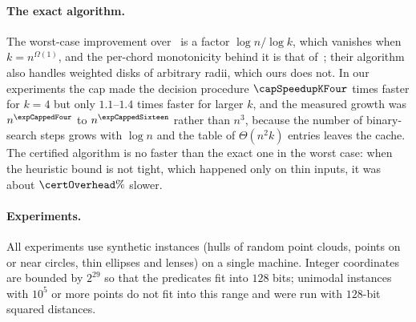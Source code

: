\paragraph{The exact algorithm.}
The worst-case improvement over~\citet{tw26} is a factor $\log n/\log k$, which
vanishes when $k=n^{\Omega(1)}$, and the per-chord monotonicity behind it is
that of~\citet{tw26}; their algorithm also handles weighted disks of arbitrary
radii, which ours does not. In our experiments the cap made the decision
procedure $\capSpeedupKFour$ times faster for $k=4$ but only $1.1$--$1.4$ times
faster for larger $k$, and the measured growth was $n^{\expCappedFour}$ to
$n^{\expCappedSixteen}$ rather than $n^3$, because the number of binary-search
steps grows with $\log n$ and the table of $\Theta(n^2k)$ entries leaves the
cache. The certified algorithm is no faster than the exact one in the worst
case: when the heuristic bound is not tight, which happened only on thin
inputs, it was about $\certOverhead\%$ slower.

\paragraph{Experiments.}
All experiments use synthetic instances (hulls of random point clouds, points
on or near circles, thin ellipses and lenses) on a single machine. Integer
coordinates are bounded by $2^{29}$ so that the predicates fit into $128$ bits;
unimodal instances with $10^5$ or more points do not fit into this range and
were run with $128$-bit squared distances.

